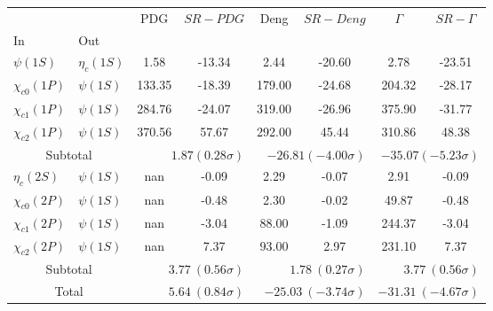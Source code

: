\begin{tabular}{|l|l|c|c|c|c|c|c|}%
\hline%
&&PDG&$SR-PDG$&Deng&$SR-Deng$&$\Gamma$&$SR-\Gamma$\\%
In&Out&&&&&&\\%
\hline%
$\psi(1S)$&$\eta_{c}(1S)$&1.58&-13.34&2.44&-20.60&2.78&-23.51\\%
$\chi_{c0}(1P)$&$\psi(1S)$&133.35&-18.39&179.00&-24.68&204.32&-28.17\\%
$\chi_{c1}(1P)$&$\psi(1S)$&284.76&-24.07&319.00&-26.96&375.90&-31.77\\%
$\chi_{c2}(1P)$&$\psi(1S)$&370.56&57.67&292.00&45.44&310.86&48.38\\%
\hline%
\hline%
\multicolumn{2}{|c|}{Subtotal}&\multicolumn{2}{|r|}{$1.87 (0.28\sigma)$}&\multicolumn{2}{|r|}{$-26.81 (-4.00\sigma)$}&\multicolumn{2}{|r|}{$-35.07 (-5.23\sigma)$}\\%
\hline%
\hline%
$\eta_{c}(2S)$&$\psi(1S)$&nan&-0.09&2.29&-0.07&2.91&-0.09\\%
$\chi_{c0}(2P)$&$\psi(1S)$&nan&-0.48&2.30&-0.02&49.87&-0.48\\%
$\chi_{c1}(2P)$&$\psi(1S)$&nan&-3.04&88.00&-1.09&244.37&-3.04\\%
$\chi_{c2}(2P)$&$\psi(1S)$&nan&7.37&93.00&2.97&231.10&7.37\\%
\hline%
\hline%
\multicolumn{2}{|c|}{Subtotal}&\multicolumn{2}{|r|}{$3.77~(0.56\sigma)$}&\multicolumn{2}{|r|}{$1.78~(0.27\sigma)$}&\multicolumn{2}{|r|}{$3.77~(0.56\sigma)$}\\%
\hline%
\hline%
\multicolumn{2}{|c|}{Total}&\multicolumn{2}{|r|}{$5.64~(0.84\sigma)$}&\multicolumn{2}{|r|}{$-25.03~(-3.74\sigma)$}&\multicolumn{2}{|r|}{$-31.31~(-4.67\sigma)$}\\%
\hline%
\end{tabular}